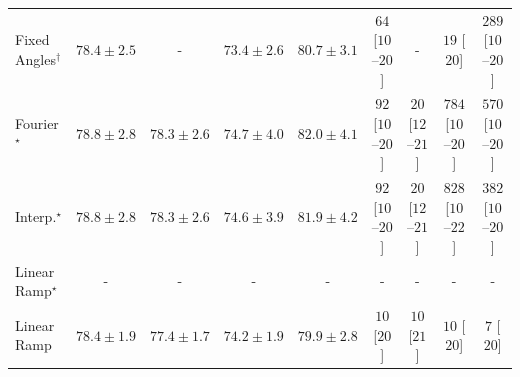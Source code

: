 \begin{tabular}{l|cccc|cccc|}
Fixed Angles$^\dagger$ & {\cellcolor[HTML]{046096}} \color[HTML]{F1F1F1} $78.4\pm 2.5$ & {\cellcolor[HTML]{000000}} \color[HTML]{F1F1F1} {\cellcolor{white}} \color{black} - & {\cellcolor[HTML]{358FC0}} \color[HTML]{F1F1F1} $73.4\pm 2.6$ & {\cellcolor[HTML]{03476F}} \color[HTML]{F1F1F1} $80.7\pm 3.1$ & {\cellcolor[HTML]{FEEBE7}} \color[HTML]{000000} $64$ [$10$--$20$] & {\cellcolor[HTML]{000000}} \color[HTML]{F1F1F1} {\cellcolor{white}} \color{black} - & {\cellcolor[HTML]{FFF5F1}} \color[HTML]{000000} $19$ [$20$] & {\cellcolor[HTML]{FBA9B8}} \color[HTML]{000000} $289$ [$10$--$20$] \\
Fourier$^\star$ & {\cellcolor[HTML]{045C90}} \color[HTML]{F1F1F1} $78.8\pm 2.8$ & {\cellcolor[HTML]{046097}} \color[HTML]{F1F1F1} $78.3\pm 2.6$ & {\cellcolor[HTML]{2081B9}} \color[HTML]{F1F1F1} $74.7\pm 4.0$ & {\cellcolor[HTML]{023858}} \color[HTML]{F1F1F1} $82.0\pm 4.1$ & {\cellcolor[HTML]{FDE4E1}} \color[HTML]{000000} $92$ [$10$--$20$] & {\cellcolor[HTML]{FFF4F0}} \color[HTML]{000000} $20$ [$12$--$21$] & {\cellcolor[HTML]{5D006F}} \color[HTML]{F1F1F1} $784$ [$10$--$20$] & {\cellcolor[HTML]{C61B8B}} \color[HTML]{F1F1F1} $570$ [$10$--$20$] \\
Interp.$^\star$ & {\cellcolor[HTML]{045C90}} \color[HTML]{F1F1F1} $78.8\pm 2.8$ & {\cellcolor[HTML]{046097}} \color[HTML]{F1F1F1} $78.3\pm 2.6$ & {\cellcolor[HTML]{2182B9}} \color[HTML]{F1F1F1} $74.6\pm 3.9$ & {\cellcolor[HTML]{02395A}} \color[HTML]{F1F1F1} $81.9\pm 4.2$ & {\cellcolor[HTML]{FDE4E1}} \color[HTML]{000000} $92$ [$10$--$20$] & {\cellcolor[HTML]{FFF4F0}} \color[HTML]{000000} $20$ [$12$--$21$] & {\cellcolor[HTML]{49006A}} \color[HTML]{F1F1F1} $828$ [$10$--$22$] & {\cellcolor[HTML]{F87CA8}} \color[HTML]{F1F1F1} $382$ [$10$--$20$] \\
Linear Ramp$^\star$ & {\cellcolor[HTML]{000000}} \color[HTML]{F1F1F1} {\cellcolor{white}} \color{black} - & {\cellcolor[HTML]{000000}} \color[HTML]{F1F1F1} {\cellcolor{white}} \color{black} - & {\cellcolor[HTML]{000000}} \color[HTML]{F1F1F1} {\cellcolor{white}} \color{black} - & {\cellcolor[HTML]{000000}} \color[HTML]{F1F1F1} {\cellcolor{white}} \color{black} - & {\cellcolor[HTML]{000000}} \color[HTML]{F1F1F1} {\cellcolor{white}} \color{black} - & {\cellcolor[HTML]{000000}} \color[HTML]{F1F1F1} {\cellcolor{white}} \color{black} - & {\cellcolor[HTML]{000000}} \color[HTML]{F1F1F1} {\cellcolor{white}} \color{black} - & {\cellcolor[HTML]{000000}} \color[HTML]{F1F1F1} {\cellcolor{white}} \color{black} - \\
Linear Ramp & {\cellcolor[HTML]{046096}} \color[HTML]{F1F1F1} $78.4\pm 1.9$ & {\cellcolor[HTML]{0567A2}} \color[HTML]{F1F1F1} $77.4\pm 1.7$ & {\cellcolor[HTML]{2786BB}} \color[HTML]{F1F1F1} $74.2\pm 1.9$ & {\cellcolor[HTML]{03517E}} \color[HTML]{F1F1F1} $79.9\pm 2.8$ & {\cellcolor[HTML]{FFF7F3}} \color[HTML]{000000} $10$ [$20$] & {\cellcolor[HTML]{FFF7F3}} \color[HTML]{000000} $10$ [$21$] & {\cellcolor[HTML]{FFF7F3}} \color[HTML]{000000} $10$ [$20$] & {\cellcolor[HTML]{FFF7F3}} \color[HTML]{000000} $7$ [$20$] \\

\end{tabular}
